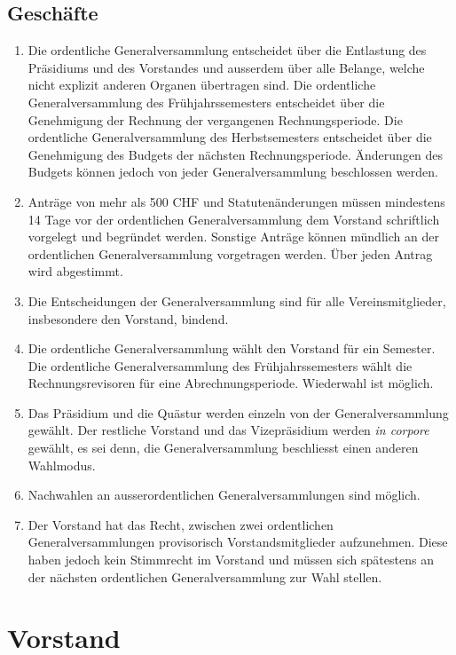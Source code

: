 \subsection{Geschäfte}
\begin{enumerate}
\item Die ordentliche Generalversammlung entscheidet über die Entlastung des Präsidiums und des Vorstandes und ausserdem über alle Belange, welche nicht explizit anderen Organen übertragen sind. Die ordentliche Generalversammlung des Frühjahrssemesters entscheidet über die Genehmigung der Rechnung der vergangenen Rechnungsperiode. Die ordentliche Generalversammlung des Herbstsemesters entscheidet über die Genehmigung des Budgets der nächsten Rechnungsperiode. Änderungen des Budgets können jedoch von jeder Generalversammlung beschlossen werden.
\item Anträge von mehr als 500 CHF und Statutenänderungen müssen mindestens 14 Tage vor der ordentlichen Generalversammlung dem Vorstand schriftlich vorgelegt und begründet werden. Sonstige Anträge können mündlich an der ordentlichen Generalversammlung vorgetragen werden. Über jeden Antrag wird abgestimmt.
\item Die Entscheidungen der Generalversammlung sind für alle Vereinsmitglieder, insbesondere den Vorstand, bindend.
\item Die ordentliche Generalversammlung wählt den Vorstand für ein Semester. Die ordentliche Generalversammlung des Frühjahrssemesters wählt die Rechnungsrevisoren für eine Abrechnungsperiode. Wiederwahl ist möglich.
\item Das Präsidium und die Quästur werden einzeln von der Generalversammlung gewählt. Der restliche Vorstand und das Vizepräsidium werden \textit{in corpore} gewählt, es sei denn, die Generalversammlung beschliesst einen anderen Wahlmodus.
\item Nachwahlen an ausserordentlichen Generalversammlungen sind möglich.
\item Der Vorstand hat das Recht, zwischen zwei ordentlichen Generalversammlungen provisorisch Vorstandsmitglieder aufzunehmen. Diese haben jedoch kein Stimmrecht im Vorstand und müssen sich spätestens an der nächsten ordentlichen Generalversammlung zur Wahl stellen.

\end{enumerate}


\section{Vorstand}

